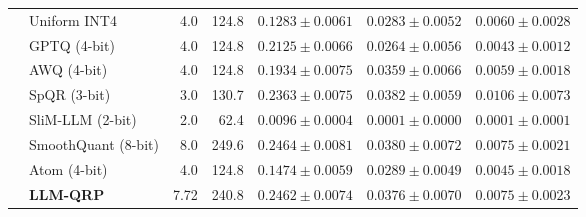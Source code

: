 \begin{table}[htbp]
\begin{tabular}{llrrrrr}
     & Uniform INT4 & 4.0 & 124.8 & $0.1283 \pm 0.0061$ & $0.0283 \pm 0.0052$ & $0.0060 \pm 0.0028$ \\
     & GPTQ (4-bit) & 4.0 & 124.8 & $0.2125 \pm 0.0066$ & $0.0264 \pm 0.0056$ & $0.0043 \pm 0.0012$ \\
     & AWQ (4-bit) & 4.0 & 124.8 & $0.1934 \pm 0.0075$ & $0.0359 \pm 0.0066$ & $0.0059 \pm 0.0018$ \\
     & SpQR (3-bit) & 3.0 & 130.7 & $0.2363 \pm 0.0075$ & \textbf{$0.0382 \pm 0.0059$} & \textbf{$0.0106 \pm 0.0073$} \\
     & SliM-LLM (2-bit) & 2.0 & 62.4 & $0.0096 \pm 0.0004$ & $0.0001 \pm 0.0000$ & $0.0001 \pm 0.0001$ \\
     & SmoothQuant (8-bit) & 8.0 & 249.6 & \textbf{$0.2464 \pm 0.0081$} & $0.0380 \pm 0.0072$ & $0.0075 \pm 0.0021$ \\
     & Atom (4-bit) & 4.0 & 124.8 & $0.1474 \pm 0.0059$ & $0.0289 \pm 0.0049$ & $0.0045 \pm 0.0018$ \\
     & \textbf{LLM-QRP} & 7.72 & 240.8 & $0.2462 \pm 0.0074$ & $0.0376 \pm 0.0070$ & $0.0075 \pm 0.0023$ \\
    \bottomrule
  \end{tabular}
\end{table}
